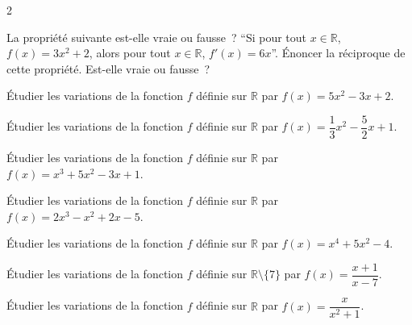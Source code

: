 \documentclass[a4paper,12pt]{article}
\begin{document}
\begin{multicols}{2}
\begin{exercice}[title=Exercice 6 $\quad \star\star \quad$ { [Raisonner] }]{}{}
La propriété suivante est-elle vraie ou fausse ? ``Si pour tout $x \in \mathbb{R}$, $f(x) = 3x^2 + 2$, alors pour tout $x \in \mathbb{R}$, $f'(x) = 6x$''.
Énoncer la réciproque de cette propriété. Est-elle vraie ou fausse ?
\end{exercice}

\begin{exercice}[title=Exercice 7 $\quad \star \quad$ { [Calculer] }]{}{}
Étudier les variations de la fonction $f$ définie sur $\mathbb{R}$ par $f(x) = 5x^2 - 3x + 2$.
\end{exercice}

\begin{exercice}[title=Exercice 8 $\quad \star \quad$ { [Calculer] }]{}{}
Étudier les variations de la fonction $f$ définie sur $\mathbb{R}$ par $f(x) = \dfrac{1}{3}x^2 - \dfrac{5}{2}x + 1$.
\end{exercice}

\begin{exercice}[title=Exercice 9 $\quad \star \quad$ { [Calculer] }]{}{}
Étudier les variations de la fonction $f$ définie sur $\mathbb{R}$ par $f(x) = x^3 + 5x^2 - 3x + 1$.
\end{exercice}
    
\begin{exercice}[title=Exercice 10 $\quad \star \quad$ { [Calculer] }]{}{}
Étudier les variations de la fonction $f$ définie sur $\mathbb{R}$ par $f(x) = 2x^3 - x^2 + 2x - 5$.
\end{exercice}

\begin{exercice}[title=Exercice 11 $\quad \star \quad$ { [Calculer] }]{}{}
Étudier les variations de la fonction $f$ définie sur $\mathbb{R}$ par $f(x) = x^4 + 5x^2 - 4$.
\end{exercice}

\begin{exercice}[title=Exercice 12 $\quad \star \quad$ { [Calculer] }]{}{}
Étudier les variations de la fonction $f$ définie sur $\mathbb{R} \setminus \{7\}$ par $f(x) = \dfrac{x+1}{x-7}$.
\end{exercice}

\begin{exercice}[title=Exercice 13 $\quad \star \quad$ { [Calculer] }]{}{}
Étudier les variations de la fonction $f$ définie sur $\mathbb{R}$ par $f(x) = \dfrac{x}{x^2 + 1}$.
\end{exercice}


\end{multicols}
\end{document}
